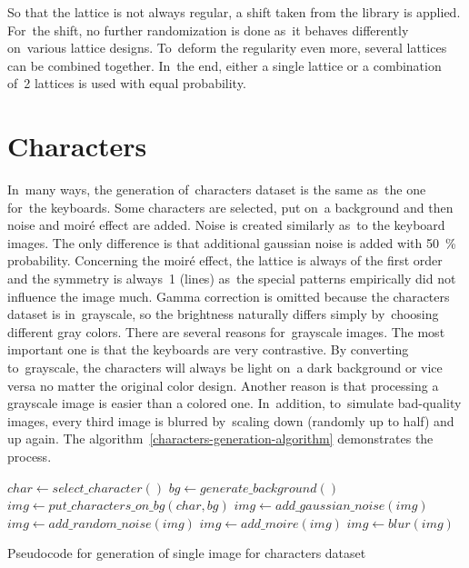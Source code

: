 So that the lattice is not always regular, a shift taken from the library is applied. For~the shift, no further randomization is done as~it behaves differently on~various lattice designs. To~deform the regularity even more, several lattices can be combined together. In~the end, either a single lattice or a combination of~2 lattices is used with equal probability.

\section{Characters}
\label{dataset-characters}
In~many ways, the generation of~characters dataset is the same as~the one for~the keyboards. Some characters are selected, put on~a background and then noise and moiré effect are added. Noise is created similarly as~to the keyboard images. The only difference is that additional gaussian noise is added with 50~\% probability. Concerning the moiré effect, the lattice is always of the first order and the symmetry is always~1 (lines) as~the special patterns empirically did not influence the image much. Gamma correction is omitted because the characters dataset is in~grayscale, so the brightness naturally differs simply by~choosing different gray colors. There are several reasons for~grayscale images. The most important one is that the keyboards are very contrastive. By converting to~grayscale, the characters will always be light on~a dark background or vice versa no matter the original color design. Another reason is that processing a grayscale image is easier than a colored one. In~addition, to~simulate bad-quality images, every third image is blurred by~scaling down (randomly up to half) and up again. The algorithm~\ref{characters-generation-algorithm} demonstrates the process.

\begin{algorithm}
    \begin{algorithmic}[1]
    \STATE $char\gets select\_character()$
    \STATE $bg\gets generate\_background()$
    \STATE $img\gets put\_characters\_on\_bg(char, bg)$
        \STATE $img\gets add\_gaussian\_noise(img)$
    \ENDIF
        \STATE $img\gets add\_random\_noise(img)$
    \ENDIF
    \STATE $img\gets add\_moire(img)$
        \STATE $img\gets blur(img)$
    \ENDIF
    \end{algorithmic}
    \caption{Pseudocode for generation of single image for characters dataset}
    \label{characters-generation-algorithm}
\end{algorithm}

